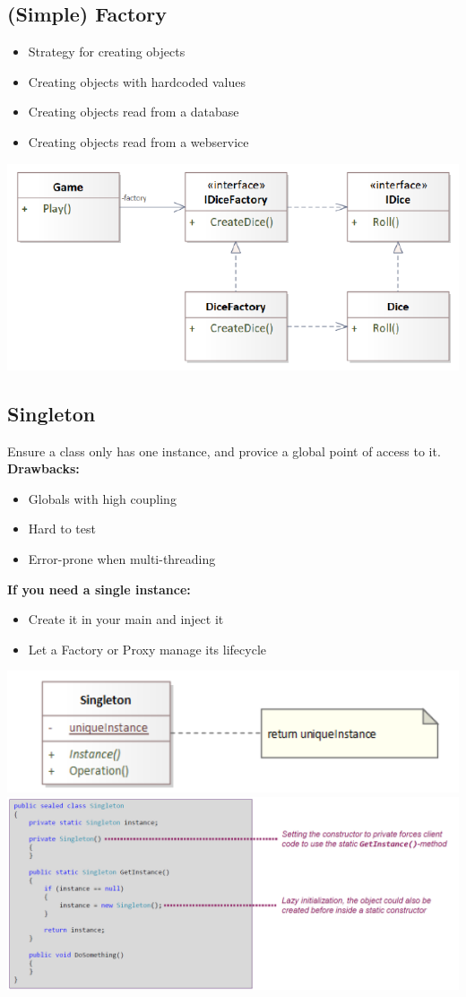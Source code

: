 \subsection{(Simple) Factory}
\begin{itemize}
    \item Strategy for creating objects
    \item Creating objects with hardcoded values
    \item Creating objects read from a database
    \item Creating objects read from a webservice
\end{itemize}
\includegraphics[width=0.7\linewidth]{../img/factory_pattern.png}

\subsection{Singleton}
Ensure a class only has one instance, and provice a global point of access to it.\\
\textbf{Drawbacks:}
\begin{itemize}
    \item Globals with high coupling
    \item Hard to test
    \item Error-prone when multi-threading
\end{itemize}
\textbf{If you need a single instance:}
\begin{itemize}
    \item Create it in your main and inject it
    \item Let a Factory or Proxy manage its lifecycle
\end{itemize}
\includegraphics[width=0.7\linewidth]{../img/singleton_pattern.png}\\
\includegraphics[width=\linewidth]{../img/singleton_pattern_code.png}

